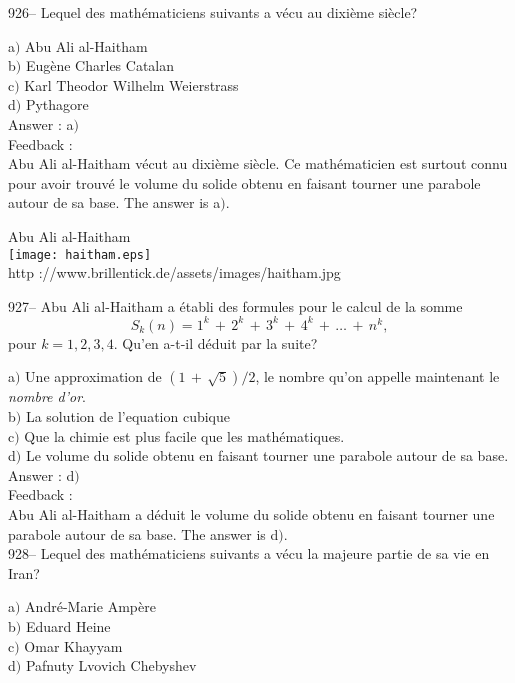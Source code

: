 \documentclass[letterpaper, 12pt]{article}
\begin{document}
926-- Lequel des math\'ematiciens suivants a v\'ecu au dixi\`eme
si\`ecle?

a$)$ Abu Ali al-Haitham \\
b$)$ Eug\`ene Charles Catalan \\
c$)$ Karl Theodor Wilhelm Weierstrass \\
d$)$ Pythagore\\

Answer : a$)$\\

Feedback : \\
Abu Ali al-Haitham v\'ecut au dixi\`eme si\`ecle. Ce math\'ematicien
est surtout connu pour avoir trouv\'e le volume du solide obtenu en
faisant tourner une parabole
autour de sa base. The answer is a$)$.\\

        \begin{center}
        Abu Ali al-Haitham\\
    \texttt{[image: haitham.eps]}\\
        {\footnotesize http ://www.brillentick.de/assets/images/haitham.jpg}
    \end{center}

927-- Abu Ali al-Haitham a \'etabli des formules pour le calcul de la somme
$$S_k(n) =1^k\,+\,2^k\,+\,3^k\,+\,4^k\,+\,\ldots\,+\,n^k,$$
pour $k=1,2,3,4$. Qu'en a-t-il d\'eduit par la suite?

a$)$ Une approximation de $(1\,+\,\sqrt5)/2$, le nombre qu'on appelle
maintenant le {\sl nombre d'or}. \\
b$)$ La solution de l'equation cubique \\
c$)$ Que la chimie est plus facile que les math\'ematiques. \\
d$)$ Le volume du solide obtenu en faisant tourner une parabole autour de sa
base.\\

Answer : d$)$\\

Feedback : \\
Abu Ali al-Haitham a d\'eduit le volume du solide obtenu en faisant tourner
une parabole autour de sa base. The answer is d$)$.\\

928-- Lequel des math\'ematiciens suivants a v\'ecu la majeure
partie de sa vie en Iran?

a$)$ Andr\'e-Marie Amp\`ere \\
b$)$ Eduard Heine \\
c$)$ Omar Khayyam \\
d$)$ Pafnuty Lvovich Chebyshev\\
\end{document}
